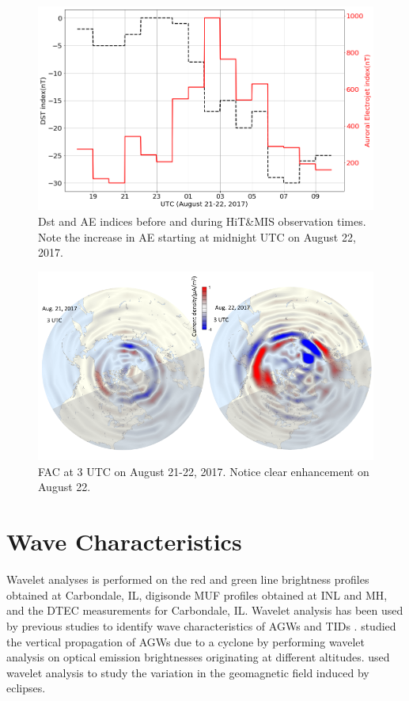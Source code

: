 \documentclass[crop=false,class=mitthesis,oneside,font=12pt]{standalone}
\begin{document}
\begin{figure}[H]
\centering\includegraphics[width=30pc]{tid_geindex.png}
\caption{Dst and AE indices before and during HiT\&MIS observation times. Note the increase in AE starting at midnight UTC on August 22, 2017. }
\label{fig:gindx}
\end{figure}
\begin{figure}[htp]
\centering\includegraphics[width=35pc]{fac.png}
\caption{FAC at 3 UTC on August 21-22, 2017. Notice clear enhancement on August 22. }
\label{fig:fac}
\end{figure}

\section{Wave Characteristics}

Wavelet analyses is performed on the red and green line brightness profiles obtained at Carbondale, IL, digisonde MUF profiles obtained at INL and MH, and the DTEC measurements for Carbondale, IL. Wavelet analysis has been used by previous studies to identify wave characteristics of AGWs and TIDs \citep[e.g.,][]{singh_effect_2016,wvlt_B}. \citet{singh_effect_2016} studied the vertical propagation of AGWs due to a cyclone by performing wavelet analysis on optical emission brightnesses originating at different altitudes. \citet{wvlt_B} used wavelet analysis to study the variation in the geomagnetic field induced by eclipses.
 
\end{document}
